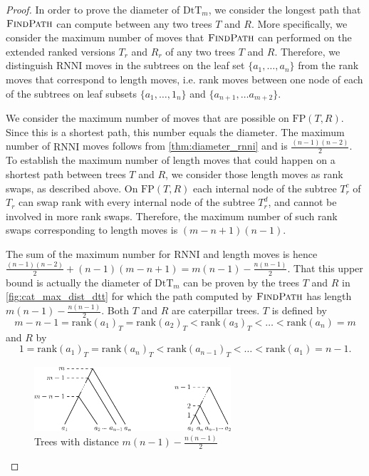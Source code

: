 \documentclass[11pt]{amsart}
\newcommand{\rnni}{\mathrm{RNNI}}
\newcommand{\findpath}{\textsc{FindPath}}
\newcommand{\rank}{\mathrm{rank}}
\newcommand{\fp}{\mathrm{FP}}
\newcommand{\dtt}{\mathrm{DtT}}
\begin{document}
\begin{proof}
	In order to prove the diameter of $\dtt_m$, we consider the longest path that $\findpath$ can compute between any two trees $T$ and $R$.
	More specifically, we consider the maximum number of moves that $\findpath$ can performed on the extended ranked versions $T_r$ and $R_r$ of any two trees $T$ and $R$.
	Therefore, we distinguish $\rnni$ moves in the subtrees on the leaf set $\{a_1, \ldots, a_n\}$ from the rank moves that correspond to length moves, i.e. rank moves between one node of each of the subtrees on leaf subsets $\{a_1, \ldots, 1_n\}$ and $\{a_{n+1}, \ldots a_{m+2}\}$.

	We consider the maximum number of moves that are possible on $\fp(T,R)$.
	Since this is a shortest path, this number equals the diameter.
	The maximum number of $\rnni$ moves follows from \autoref{thm:diameter_rnni} and is $\frac{(n-1)(n-2)}{2}$.
	To establish the maximum number of length moves that could happen on a shortest path between trees $T$ and $R$, we consider those length moves as rank swaps, as described above.
	On $\fp(T,R)$ each internal node of the subtree $T_r^c$ of $T_r$ can swap rank with every internal node of the subtree $T_r^d$, and cannot be involved in more rank swaps.
	Therefore, the maximum number of such rank swaps corresponding to length moves is $(m-n+1)(n-1)$.

	The sum of the maximum number for $\rnni$ and length moves is hence $\frac{(n-1)(n-2)}{2} + (n-1)(m-n+1) = m(n-1) - \frac{n(n-1)}{2}$.
	That this upper bound is actually the diameter of $\dtt_m$ can be proven by the trees $T$ and $R$ in \autoref{fig:cat_max_dist_dtt} for which the path computed by $\findpath$ has length $m(n-1) - \frac{n(n-1)}{2}$.
	Both $T$ and $R$ are caterpillar trees.
	$T$ is defined by
	\[m-n-1 = \rank(a_1)_T = \rank(a_2)_T < \rank(a_3)_T < \ldots < \rank(a_n) = m\]
	and $R$ by
	\[1 = \rank(a_1)_T = \rank(a_n)_T < \rank(a_{n-1})_T < \ldots < \rank(a_1) = n-1.\]
	\begin{figure}[ht]
		\includegraphics[width=0.65\textwidth]{cat_max_dist_dtt.eps}
		\caption{Trees with distance $m(n-1) - \frac{n(n-1)}{2}$}
		\label{fig:cat_max_dist_dtt}
	\end{figure}
\end{proof}
\end{document}
